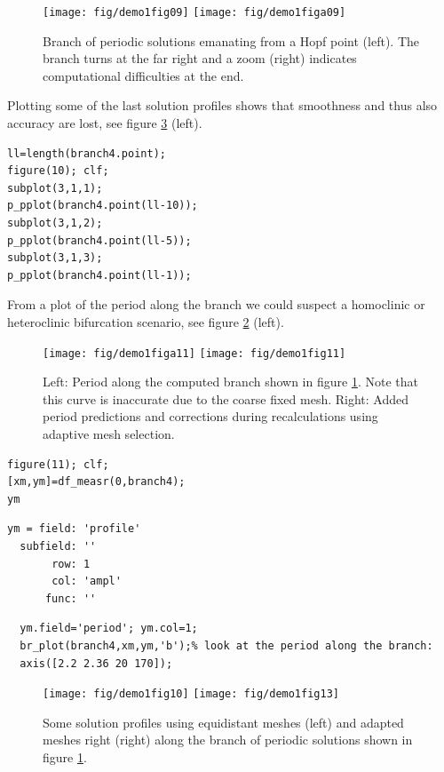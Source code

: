 \documentclass[10pt]{scrartcl}
\begin{document}
\begin{figure}[h]
\begin{center}
\texttt{[image: fig/demo1fig09]}
\texttt{[image: fig/demo1figa09]}
\end{center}
\caption{\label{ride9_pic}Branch of periodic solutions emanating
from a Hopf point (left). The branch turns at the far right and a zoom (right)
indicates computational difficulties at the end.} 
\end{figure}
Plotting some of the last solution profiles shows that smoothness
and thus also accuracy are lost, see figure \ref{ride10+13_pic} (left).
\begin{lstlisting}
ll=length(branch4.point);
figure(10); clf;
subplot(3,1,1);
p_pplot(branch4.point(ll-10));
subplot(3,1,2);
p_pplot(branch4.point(ll-5));
subplot(3,1,3);
p_pplot(branch4.point(ll-1));
\end{lstlisting}
From a plot of the period along the branch we could suspect a homoclinic
or heteroclinic bifurcation scenario, see figure \ref{ride11_pic} (left).
\begin{figure}[h]
\begin{center}
\texttt{[image: fig/demo1figa11]}
\texttt{[image: fig/demo1fig11]}
\end{center}
\caption{\label{ride11_pic}Left: Period along the computed branch
  shown in figure \ref{ride9_pic}. Note that this curve is inaccurate
  due to the coarse fixed mesh. Right: Added period predictions and
  corrections during recalculations using adaptive mesh selection.}
\end{figure}
\begin{lstlisting}
figure(11); clf;
[xm,ym]=df_measr(0,branch4); 
ym
\end{lstlisting}
{\small
\begin{verbatim}
ym = field: 'profile'
  subfield: ''
       row: 1
       col: 'ampl'
      func: ''
\end{verbatim}}
\begin{lstlisting}
  ym.field='period'; ym.col=1;
  br_plot(branch4,xm,ym,'b');% look at the period along the branch:
  axis([2.2 2.36 20 170]);
\end{lstlisting}
\begin{figure}[h]
\begin{center}
\texttt{[image: fig/demo1fig10]}
\texttt{[image: fig/demo1fig13]}
\end{center}
\caption{\label{ride10+13_pic}Some solution profiles
using equidistant meshes (left) and adapted meshes right (right) 
along the branch of periodic solutions 
shown in figure \ref{ride9_pic}.} 
\end{figure}
\end{document}
